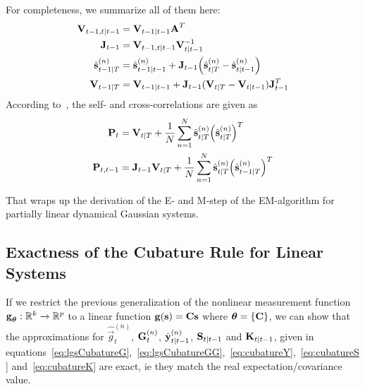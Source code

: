 		For completeness, we summarize all of them here:
		\begin{align}
			\boldsymbol{\mathrm{V}}_{t - 1, t \vert t - 1} &= \boldsymbol{\mathrm{V}}_{t - 1 \vert t - 1} \boldsymbol{\mathrm{A}}^T  \nonumber \\
			\boldsymbol{\mathrm{J}}_{t - 1} &= \boldsymbol{\mathrm{V}}_{t - 1, t \vert t - 1} \boldsymbol{\mathrm{V}}_{t \vert t - 1}^{-1}  \nonumber \\
			\hat{\boldsymbol{\mathrm{s}}}_{t - 1 \vert T}^{(n)} &= \hat{\boldsymbol{\mathrm{s}}}_{t - 1 \vert t - 1}^{(n)} + \boldsymbol{\mathrm{J}}_{t - 1} \Big(\hat{\boldsymbol{\mathrm{s}}}_{t \vert T}^{(n)} - \hat{\boldsymbol{\mathrm{s}}}_{t \vert t - 1}^{(n)}\Big)  \label{eq:posteriorMean} \\
			\boldsymbol{\mathrm{V}}_{t - 1 \vert T} &= \boldsymbol{\mathrm{V}}_{t - 1 \vert t - 1} + \boldsymbol{\mathrm{J}}_{t - 1} (\boldsymbol{\mathrm{V}}_{t \vert T} - \boldsymbol{\mathrm{V}}_{t \vert t - 1}) \boldsymbol{\mathrm{J}}_{t - 1}^T  \label{eq:posteriorCov}
		\end{align}
		According to~\cite{minkaBayesianLinearRegression1999}, the self- and cross-correlations are given as
		\begin{align*}
			\boldsymbol{\mathrm{P}}_t &= \boldsymbol{\mathrm{V}}_{t \vert T} + \frac{1}{N} \sum_{n = 1}^{N} \hat{\boldsymbol{\mathrm{s}}}_{t \vert T}^{(n)} \Big(\hat{\boldsymbol{\mathrm{s}}}_{t \vert T}^{(n)}\Big)^T \\
			\boldsymbol{\mathrm{P}}_{t, t - 1} &= \boldsymbol{\mathrm{J}}_{t - 1} \boldsymbol{\mathrm{V}}_{t \vert T} + \frac{1}{N} \sum_{n = 1}^{N} \hat{\boldsymbol{\mathrm{s}}}_{t \vert T}^{(n)} \Big(\hat{\boldsymbol{\mathrm{s}}}_{t - 1 \vert T}^{(n)}\Big)^T
		\end{align*}

		That wraps up the derivation of the E- and M-step of the EM-algorithm for partially linear dynamical Gaussian systems.

	\subsection{Exactness of the Cubature Rule for Linear Systems}
		If we restrict the previous generalization of the nonlinear measurement function \( \boldsymbol{\mathrm{g}}_{\boldsymbol{\mathrm{\theta}}} : \mathbb{R}^k \to \mathbb{R}^p \) to a linear function \( \boldsymbol{\mathrm{g}}(\boldsymbol{\mathrm{s}}) = \boldsymbol{\mathrm{C}} \boldsymbol{\mathrm{s}} \) where \( \boldsymbol{\mathrm{\theta}} = \{ \boldsymbol{\mathrm{C}} \} \), we can show that the approximations for \( \hat{\vec{g}}_t^{(n)} \), \( \boldsymbol{\mathrm{G}}_t^{(n)} \), \( \hat{\boldsymbol{\mathrm{y}}}_{t \vert t - 1}^{(n)} \), \( \boldsymbol{\mathrm{S}}_{t \vert t - 1} \) and \( \boldsymbol{\mathrm{K}}_{t \vert t - 1} \), given in equations~\eqref{eq:lgsCubatureG},~\eqref{eq:lgsCubatureGG},~\eqref{eq:cubatureY},~\eqref{eq:cubatureS} and~\eqref{eq:cubatureK} are exact, \ac{ie} they match the real expectation/covariance value.

